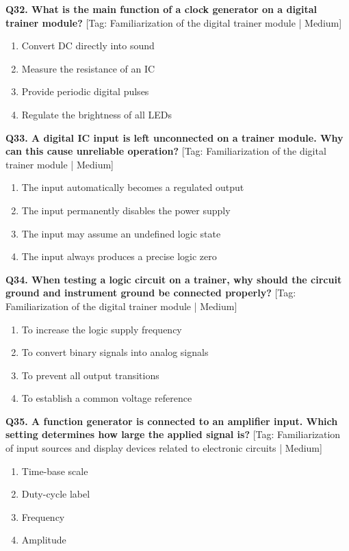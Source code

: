 \noindent\textbf{Q32. What is the main function of a clock generator on a digital trainer module?} \hfill [Tag: Familiarization of the digital trainer module | Medium]
\begin{enumerate}[label=(\alph*),topsep=2pt,itemsep=1pt,partopsep=0pt,parsep=0pt]
    \item {Convert DC directly into sound}
    \item {Measure the resistance of an IC}
    \item {Provide periodic digital pulses}
    \item {Regulate the brightness of all LEDs}
\end{enumerate}
\vspace{2mm}

\noindent\textbf{Q33. A digital IC input is left unconnected on a trainer module. Why can this cause unreliable operation?} \hfill [Tag: Familiarization of the digital trainer module | Medium]
\begin{enumerate}[label=(\alph*),topsep=2pt,itemsep=1pt,partopsep=0pt,parsep=0pt]
    \item {The input automatically becomes a regulated output}
    \item {The input permanently disables the power supply}
    \item {The input may assume an undefined logic state}
    \item {The input always produces a precise logic zero}
\end{enumerate}
\vspace{2mm}

\noindent\textbf{Q34. When testing a logic circuit on a trainer, why should the circuit ground and instrument ground be connected properly?} \hfill [Tag: Familiarization of the digital trainer module | Medium]
\begin{enumerate}[label=(\alph*),topsep=2pt,itemsep=1pt,partopsep=0pt,parsep=0pt]
    \item {To increase the logic supply frequency}
    \item {To convert binary signals into analog signals}
    \item {To prevent all output transitions}
    \item {To establish a common voltage reference}
\end{enumerate}
\vspace{2mm}

\noindent\textbf{Q35. A function generator is connected to an amplifier input. Which setting determines how large the applied signal is?} \hfill [Tag: Familiarization of input sources and display devices related to electronic circuits | Medium]
\begin{enumerate}[label=(\alph*),topsep=2pt,itemsep=1pt,partopsep=0pt,parsep=0pt]
    \item {Time-base scale}
    \item {Duty-cycle label}
    \item {Frequency}
    \item {Amplitude}
\end{enumerate}
\vspace{2mm}

